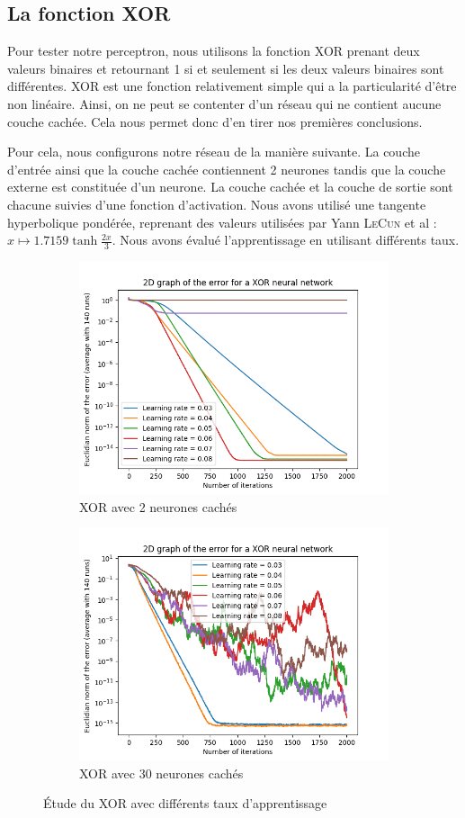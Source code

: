\subsection{La fonction XOR}

Pour tester notre perceptron, nous utilisons la fonction XOR prenant deux valeurs binaires et retournant 1 si et seulement si les deux valeurs binaires sont
différentes. XOR est une fonction relativement simple qui a la particularité d'être non linéaire. Ainsi, on ne peut se contenter d'un réseau qui ne contient aucune
couche cachée. Cela nous permet donc d'en tirer nos premières conclusions.

Pour cela, nous configurons notre réseau de la manière suivante. La couche d'entrée ainsi que la couche cachée contiennent 2 neurones tandis que la couche externe
est constituée d'un neurone. La couche cachée et la couche de sortie sont chacune suivies d'une fonction d'activation. Nous avons utilisé une tangente hyperbolique
pondérée, reprenant des valeurs utilisées par Yann \textsc{LeCun} et al : $ x \mapsto 1.7159\tanh{\frac{2x}{3}}$. Nous avons évalué l'apprentissage en utilisant différents
taux.

\begin{figure}[h]
 \centering
 \begin{subfigure}{0.5\textwidth}
  \centering
  \includegraphics[width=0.6\linewidth]{img/XOR2D.png}
  \caption{XOR avec 2 neurones cachés}
  \label{fig:xor2D-2}
 \end{subfigure}
 \begin{subfigure}{0.4\textwidth}
  \centering
  \includegraphics[width=0.8\linewidth]{img/XOR30.png}
  \caption{XOR avec 30 neurones cachés}
  \label{fig:xor2D-30}
 \end{subfigure}
 \caption{Étude du XOR avec différents taux d'apprentissage}
 \label{fig:xor2D}
\end{figure}
 
